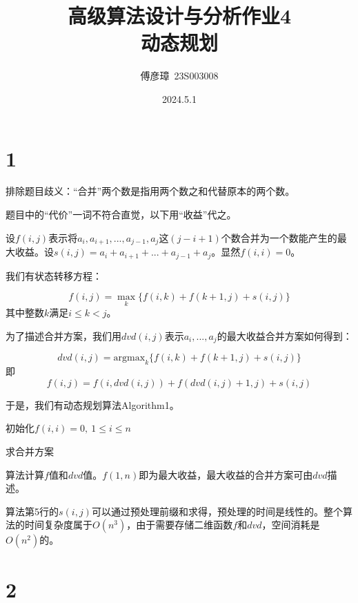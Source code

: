 \documentclass{ctexart}
\title{高级算法设计与分析作业4\\动态规划}
\author{傅彦璋\ 23S003008}
\date{2024.5.1}
\begin{document}
\maketitle

\section*{1}

排除题目歧义：“合并”两个数是指用两个数之和代替原本的两个数。

题目中的“代价”一词不符合直觉，以下用“收益”代之。


设$f(i,j)$表示将$a_i,a_{i+1},...,a_{j-1},a_j$这$(j-i+1)$个数合并为一个数能产生的最大收益。设$s(i,j)=a_i+a_{i+1}+...+a_{j-1}+a_j$。显然$f(i,i)=0$。

我们有状态转移方程：

$$
f(i,j) = \max _k \{ f(i,k)+f(k+1,j)+s(i,j) \}
$$
其中整数$k$满足$i\le k <j$。

为了描述合并方案，我们用$dvd(i,j)$表示$a_i,...,a_j$的最大收益合并方案如何得到：

$$
dvd(i,j) = \mathrm{argmax} _k \{ f(i,k)+f(k+1,j)+s(i,j) \}
$$
即
$$
f(i,j) = f(i,dvd(i,j)) + f(dvd(i,j)+1,j) + s(i,j)
$$

于是，我们有动态规划算法Algorithm1。


\begin{algorithm}[H]
  \SetAlgoLined

  初始化$f(i,i)=0,\ 1\le i \le n$\;
  \caption{求合并方案}
\end{algorithm}

算法计算$f$值和$dvd$值。$f(1,n)$即为最大收益，最大收益的合并方案可由$dvd$描述。

算法第5行的$s(i,j)$可以通过预处理前缀和求得，预处理的时间是线性的。整个算法的时间复杂度属于$O(n^3)$，由于需要存储二维函数$f$和$dvd$，空间消耗是$O(n^2)$的。


\section*{2}
\end{document}
